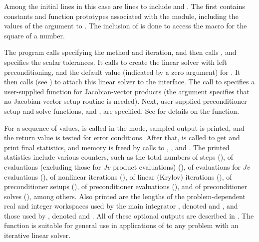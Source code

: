 Among the initial  lines in this case are lines to
include  and .  The first
contains constants and function prototypes associated with the
{\sunlinsolspgmr} module, including the values of the 
argument to . The inclusion of  is
done to access the  macro for the square of a 
number. 

The  program calls  specifying the  method
and  iteration, and then calls , and
 specifies the scalar tolerances.
It calls  to create the {\spgmr} linear solver with left
preconditioning, and the default value (indicated by a zero argument)
for .  It then calls  (see
) to attach this linear solver to the
{\cvls} interface.  The call to  specifies a
user-supplied function for Jacobian-vector products (the 
argument specifies that no Jacobian-vector setup routine is needed). 
Next, user-supplied preconditioner setup and solve functions,
 and , are specified. See
 for details on the
 function.

For a sequence of  values,  is called in the
 mode, sampled output is printed, and the return value is
tested for error conditions.  After that,  is called
to get and print final statistics, and memory is freed by calls to
, , and .  The printed
statistics include various counters, such as the total numbers of steps
(), of  evaluations (excluding those for $Jv$ product
evaluations) (), of  evaluations for $Jv$ evaluations (),
of nonlinear iterations (), of linear (Krylov) iterations (),
of preconditioner setups (), of preconditioner evaluations
(), and of preconditioner solves (), among others.  
Also printed are the lengths of the problem-dependent real and integer
workspaces used by the main integrator , denoted  and
, and those used by {\cvls}, denoted  and .
All of these optional outputs are described in .
The  function is suitable for general use in applications
of {\cvode} to any problem with an iterative linear solver.


